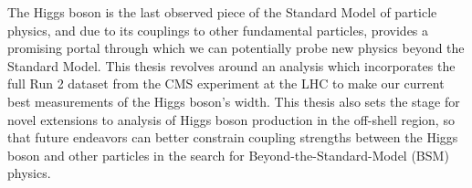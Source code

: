 

The Higgs boson is the last observed piece of the Standard Model of particle physics, and due to its couplings to other fundamental particles, provides a promising portal through which we can potentially probe new physics beyond the Standard Model. This thesis revolves around an analysis which incorporates the full Run 2 dataset from the CMS experiment at the LHC to make our current best measurements of the Higgs boson's width. This thesis also sets the stage for novel extensions to analysis of Higgs boson production in the off-shell region, so that future endeavors can better constrain coupling strengths between the Higgs boson and other particles in the search for Beyond-the-Standard-Model (BSM) physics. 

\vspace{1in}


